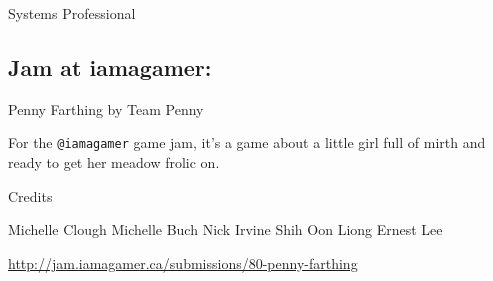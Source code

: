 \documentclass[]{book}
\begin{document}
Systems Professional

\subsection{Jam at iamagamer:}\label{jam-at-iamagamer}

Penny Farthing by Team Penny

For the \texttt{@iamagamer} game jam, it's a game about a little girl
full of mirth and ready to get her meadow frolic on.

Credits

Michelle Clough Michelle Buch Nick Irvine Shih Oon Liong Ernest Lee

\url{http://jam.iamagamer.ca/submissions/80-penny-farthing}


\end{document}
